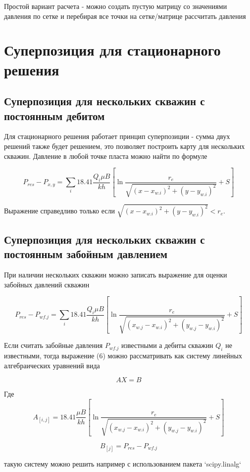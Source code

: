 Простой вариант расчета  - можно создать пустую матрицу со значениями давления по сетке и перебирая все точки на сетке/матрице рассчитать давления

\section{Суперпозиция для стационарного решения}

\subsection{Суперпозиция для нескольких скважин с постоянным дебитом} 

Для стационарного решения работает принцип суперпозиции - сумма двух решений также будет решением, это позволяет построить карту для нескольких скважин.
Давление в любой точке пласта можно найти по формуле

\begin{equation}
	P_{res} - P_{x,y} =  \sum_{i} 18.41\dfrac{ Q_i\mu B }{kh} \left[ \ln\frac{r_e}{\sqrt{ (x-x_{w.i})^2 + (y-y_{w.i})^2 }} +S \right]
\end{equation}

Выражение справедливо только если $\sqrt{ (x-x_{w.i})^2 + (y-y_{w.i})^2 }< r_e$.

\subsection{Суперпозиция для нескольких скважин с постоянным забойным давлением}

При наличии нескольких скважин можно записать выражение для оценки забойных давлений скважин


$$
P_{res} - P_{wf.j} =  \sum_{i} 18.41\dfrac{ Q_i\mu B }{kh} \left[ \ln\dfrac{r_e}{\sqrt{ (x_{w.j}-x_{w.i})^2 + (y_{w.j}-y_{w.i})^2 }} +S \right]
$$

Если считать забойные давления $P_{wf.j}$ известными а дебиты скважин $Q_i$ не известными, тогда выражение (6) можно рассматривать как систему линейных алгебраических уравнений вида

$$AX = B$$

Где
$$
A_{[i,j]} = 18.41\dfrac{ \mu B }{kh} \left[ \ln\dfrac{r_e}{\sqrt{ (x_{w.j}-x_{w.i})^2 + (y_{w.j}-y_{w.i})^2 }} +S \right]
$$

$$
B_{[j]}=P_{res} - P_{wf.j}
$$

такую систему можно решить например с использованием пакета `scipy.linalg` 

